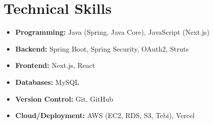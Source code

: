 \documentclass[11pt,a4paper]{article}
\begin{document}
\section{Technical Skills}
\begin{adjustwidth}{2em}{}
\begin{itemize}[leftmargin=*]
    \item \textbf{Programming:} Java (Spring, Java Core), JavaScript (Next.js)
    \item \textbf{Backend:} Spring Boot, Spring Security, OAuth2, Struts
    \item \textbf{Frontend:} Next.js, React
    \item \textbf{Databases:} MySQL
    \item \textbf{Version Control:} Git, GitHub
    \item \textbf{Cloud/Deployment:} AWS (EC2, RDS, S3, Tebi), Vercel
\end{itemize}
\end{adjustwidth}

\newpage
\end{document}
